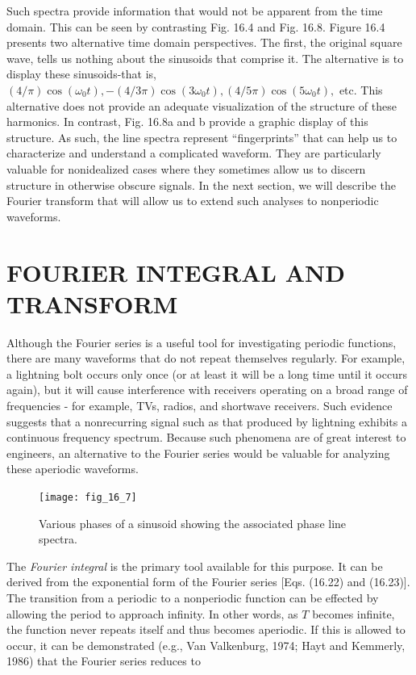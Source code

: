 \documentclass[../main.tex]{subfiles}
\begin{document}
Such spectra provide information that would not be apparent from the time domain.
This can be seen by contrasting Fig. 16.4 and Fig. 16.8. Figure 16.4 presents two alternative time domain perspectives. The first, the original square wave, tells us nothing
about the sinusoids that comprise it. The alternative is to display these sinusoids-that
is, $(4 / \pi) \cos(\omega_0 t), -(4/3 \pi) \cos(3 \omega_0 t), (4/5 \pi) \cos(5 \omega_0t ),$ etc. This alternative does
not provide an adequate visualization of the structure of these harmonics. In contrast,
Fig. 16.8a and b provide a graphic display of this structure. As such, the line spectra
represent ``fingerprints'' that can help us to characterize and understand a complicated
waveform. They are particularly valuable for nonidealized cases where they sometimes
allow us to discern structure in otherwise obscure signals. In the next section, we will
describe the Fourier transform that will allow us to extend such analyses to nonperiodic
waveforms.

\label{cha:cha_P_16_4} %
\section{FOURIER INTEGRAL AND TRANSFORM}

\noindent Although the Fourier series is a useful tool for investigating periodic functions, there are
many waveforms that do not repeat themselves regularly. For example, a lightning bolt
occurs only once (or at least it will be a long time until it occurs again), but it will cause interference with receivers operating on a broad range of frequencies - for example, TVs,
radios, and shortwave receivers. Such evidence suggests that a nonrecurring signal such as
that produced by lightning exhibits a continuous frequency spectrum. Because such phenomena are of great interest to engineers, an alternative to the Fourier series would be valuable for analyzing these aperiodic waveforms.

\begin{figure}[H] 
	\centering
	\texttt{[image: fig\_16\_7]}
	\caption{\textsf{Various phases of a sinusoid showing the associated phase line spectra.}}
	\label{fig:fig_16_7}
\end{figure}

The \textit{Fourier integral} is the primary tool available for this purpose. It can be derived
from the exponential form of the Fourier series [Eqs. (16.22) and (16.23)]. The transition
from a periodic to a nonperiodic function can be effected by allowing the period to approach infinity. In other words, as $T$ becomes infinite, the function never repeats itself and
thus becomes aperiodic. If this is allowed to occur, it can be demonstrated (e.g., Van
Valkenburg, 1974; Hayt and Kemmerly, 1986) that the Fourier series reduces to
\end{document}

